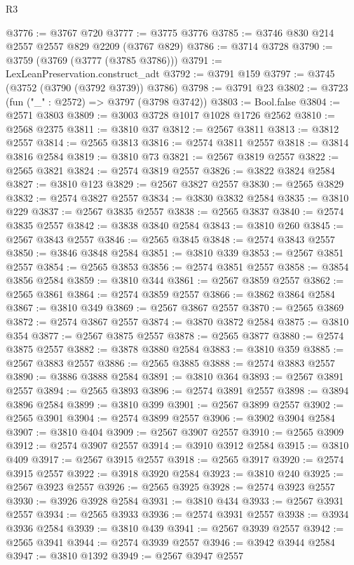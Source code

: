 \begin{lexlean}{R3}
\begin{coremodule}
@3776 := @3767 @720
@3777 := @3775 @3776
@3785 := @3746 @830 @214 @2557 @2557 @829 @2209 (@3767 @829)
@3786 := @3714 @3728
@3790 := @3759 (@3769 (@3777 (@3785 @3786)))
@3791 := LexLeanPreservation.construct_adt
@3792 := @3791 @159
@3797 := @3745 (@3752 (@3790 (@3792 @3739)) @3786)
@3798 := @3791 @23
@3802 := @3723 (fun ("_" : @2572) => @3797 (@3798 @3742))
@3803 := Bool.false
@3804 := @2571 @3803
@3809 := @3003 @3728 @1017 @1028 @1726 @2562
@3810 := @2568 @2375
@3811 := @3810 @37
@3812 := @2567 @3811
@3813 := @3812 @2557
@3814 := @2565 @3813
@3816 := @2574 @3811 @2557
@3818 := @3814 @3816 @2584
@3819 := @3810 @73
@3821 := @2567 @3819 @2557
@3822 := @2565 @3821
@3824 := @2574 @3819 @2557
@3826 := @3822 @3824 @2584
@3827 := @3810 @123
@3829 := @2567 @3827 @2557
@3830 := @2565 @3829
@3832 := @2574 @3827 @2557
@3834 := @3830 @3832 @2584
@3835 := @3810 @229
@3837 := @2567 @3835 @2557
@3838 := @2565 @3837
@3840 := @2574 @3835 @2557
@3842 := @3838 @3840 @2584
@3843 := @3810 @260
@3845 := @2567 @3843 @2557
@3846 := @2565 @3845
@3848 := @2574 @3843 @2557
@3850 := @3846 @3848 @2584
@3851 := @3810 @339
@3853 := @2567 @3851 @2557
@3854 := @2565 @3853
@3856 := @2574 @3851 @2557
@3858 := @3854 @3856 @2584
@3859 := @3810 @344
@3861 := @2567 @3859 @2557
@3862 := @2565 @3861
@3864 := @2574 @3859 @2557
@3866 := @3862 @3864 @2584
@3867 := @3810 @349
@3869 := @2567 @3867 @2557
@3870 := @2565 @3869
@3872 := @2574 @3867 @2557
@3874 := @3870 @3872 @2584
@3875 := @3810 @354
@3877 := @2567 @3875 @2557
@3878 := @2565 @3877
@3880 := @2574 @3875 @2557
@3882 := @3878 @3880 @2584
@3883 := @3810 @359
@3885 := @2567 @3883 @2557
@3886 := @2565 @3885
@3888 := @2574 @3883 @2557
@3890 := @3886 @3888 @2584
@3891 := @3810 @364
@3893 := @2567 @3891 @2557
@3894 := @2565 @3893
@3896 := @2574 @3891 @2557
@3898 := @3894 @3896 @2584
@3899 := @3810 @399
@3901 := @2567 @3899 @2557
@3902 := @2565 @3901
@3904 := @2574 @3899 @2557
@3906 := @3902 @3904 @2584
@3907 := @3810 @404
@3909 := @2567 @3907 @2557
@3910 := @2565 @3909
@3912 := @2574 @3907 @2557
@3914 := @3910 @3912 @2584
@3915 := @3810 @409
@3917 := @2567 @3915 @2557
@3918 := @2565 @3917
@3920 := @2574 @3915 @2557
@3922 := @3918 @3920 @2584
@3923 := @3810 @240
@3925 := @2567 @3923 @2557
@3926 := @2565 @3925
@3928 := @2574 @3923 @2557
@3930 := @3926 @3928 @2584
@3931 := @3810 @434
@3933 := @2567 @3931 @2557
@3934 := @2565 @3933
@3936 := @2574 @3931 @2557
@3938 := @3934 @3936 @2584
@3939 := @3810 @439
@3941 := @2567 @3939 @2557
@3942 := @2565 @3941
@3944 := @2574 @3939 @2557
@3946 := @3942 @3944 @2584
@3947 := @3810 @1392
@3949 := @2567 @3947 @2557

\end{coremodule}
\end{lexlean}
